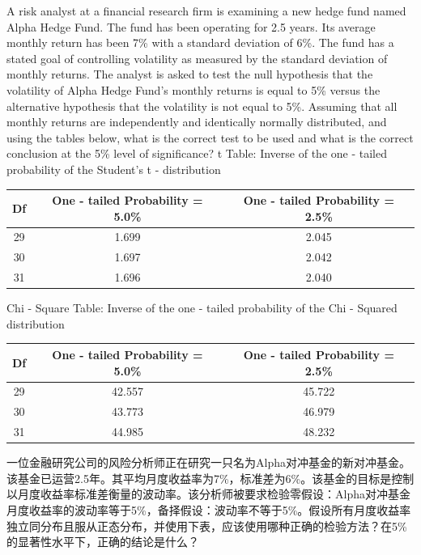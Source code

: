 \documentclass{article}
\newcounter{question} %
\begin{document}
    \begin{question}
        A risk analyst at a financial research firm is examining a new hedge fund named Alpha Hedge Fund. The fund has been operating for 2.5 years. Its average monthly return has been 7\% with a standard deviation of 6\%. The fund has a stated goal of controlling volatility as measured by the standard deviation of monthly returns. The analyst is asked to test the null hypothesis that the volatility of Alpha Hedge Fund's monthly returns is equal to 5\% versus the alternative hypothesis that the volatility is not equal to 5\%. Assuming that all monthly returns are independently and identically normally distributed, and using the tables below, what is the correct test to be used and what is the correct conclusion at the 5\% level of significance?
        t Table: Inverse of the one - tailed probability of the Student's t - distribution
        \begin{center}
        \begin{tabular}{|c|c|c|}
        \hline
        Df & One - tailed Probability = 5.0\% & One - tailed Probability = 2.5\% \\
        \hline
        29 & 1.699 & 2.045 \\
        \hline
        30 & 1.697 & 2.042 \\
        \hline
        31 & 1.696 & 2.040 \\
        \hline
        \end{tabular}
        \end{center}
        Chi - Square Table: Inverse of the one - tailed probability of the Chi - Squared distribution
        \begin{center}
        \begin{tabular}{|c|c|c|}
        \hline
        Df & One - tailed Probability = 5.0\% & One - tailed Probability = 2.5\% \\
        \hline
        29 & 42.557 & 45.722 \\
        \hline
        30 & 43.773 & 46.979 \\
        \hline
        31 & 44.985 & 48.232 \\
        \hline
        \end{tabular}
        \end{center}
        一位金融研究公司的风险分析师正在研究一只名为Alpha对冲基金的新对冲基金。该基金已运营2.5年。其平均月度收益率为7\%，标准差为6\%。该基金的目标是控制以月度收益率标准差衡量的波动率。该分析师被要求检验零假设：Alpha对冲基金月度收益率的波动率等于5\%，备择假设：波动率不等于5\%。假设所有月度收益率独立同分布且服从正态分布，并使用下表，应该使用哪种正确的检验方法？在5\%的显著性水平下，正确的结论是什么？

\end{question}
\end{document}

